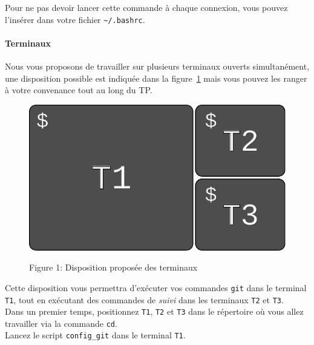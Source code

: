 \documentclass[final, a4paper, openbib, ]{article}
\newcommand{\WR}[1]{\textcolor{purple}{#1}}
\newcommand{\WR}[1]{{#1}}
\begin{document}
Pour ne pas devoir lancer cette commande à chaque connexion, vous pouvez l'insérer dans votre fichier \texttt{\~{}/.bashrc}.

%

\paragraph{Terminaux}
Nous vous proposons de travailler sur plusieurs terminaux ouverts simultanément, une disposition possible est indiquée dans la figure~\ref{terminals} mais vous pouvez les ranger à votre convenance tout au long du TP.
\begin{figure}[h]
	\centering
	{\includegraphics[scale=0.45]{images/terminals.pdf}}
	\caption{Figure 1: Disposition proposée des terminaux}
	\label{terminals}
\end{figure}

Cette disposition vous permettra d'exécuter vos commandes \texttt{git} dans le terminal \texttt{T1}, tout en exécutant des commandes de \textit{suivi} dans les terminaux \texttt{T2} et \texttt{T3}.\\

Dans un premier temps, positionnez \texttt{T1}, \texttt{T2} et \texttt{T3} dans le répertoire où vous allez travailler via la commande \texttt{cd}.\\
Lancez le script \texttt{config\_git} dans le terminal \texttt{T1}.\\
\end{document}
